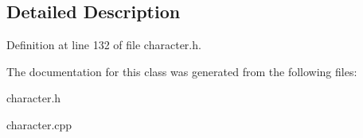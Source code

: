 \subsection{Detailed Description}


Definition at line 132 of file character.\+h.



The documentation for this class was generated from the following files\+:\begin{DoxyCompactItemize}
\item 
character.\+h\item 
character.\+cpp\end{DoxyCompactItemize}
